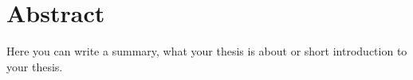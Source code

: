 \chapter*{Abstract}
\thispagestyle{empty}

Here you can write a summary, what your thesis is about or short introduction to your thesis.

\bt
